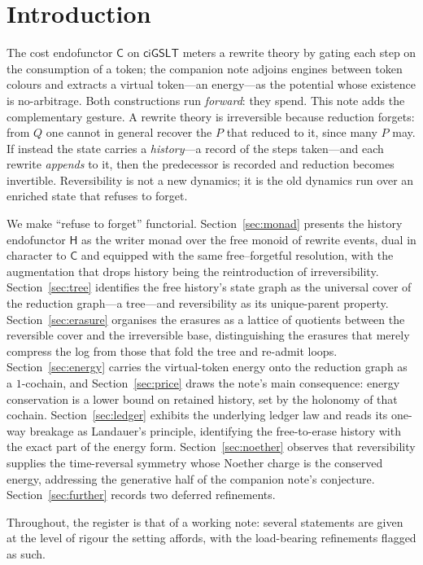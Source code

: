 \documentclass[11pt]{article}
\theoremstyle{definition}
\theoremstyle{plain}
\theoremstyle{remark}
\newcommand{\cost}{\mathsf{C}}
\newcommand{\hist}{\mathsf{H}}
\newcommand{\ciGSLT}{\mathsf{ciGSLT}}
\begin{document}
\section{Introduction}

The cost endofunctor $\cost$ on $\ciGSLT$ \cite{CE} meters a rewrite theory by gating each step on
the consumption of a token; the companion note \cite{VT} adjoins engines between token colours and
extracts a virtual token---an energy---as the potential whose existence is no-arbitrage. Both
constructions run \emph{forward}: they spend. This note adds the complementary gesture. A rewrite
theory is irreversible because reduction forgets: from $Q$ one cannot in general recover the $P$
that reduced to it, since many $P$ may. If instead the state carries a \emph{history}---a record of
the steps taken---and each rewrite \emph{appends} to it, then the predecessor is recorded and
reduction becomes invertible. Reversibility is not a new dynamics; it is the old dynamics run over
an enriched state that refuses to forget.

We make ``refuse to forget'' functorial. Section~\ref{sec:monad} presents the history endofunctor
$\hist$ as the writer monad over the free monoid of rewrite events, dual in character to $\cost$
and equipped with the same free--forgetful resolution, with the augmentation that drops history
being the reintroduction of irreversibility. Section~\ref{sec:tree} identifies the free history's
state graph as the universal cover of the reduction graph---a tree---and reversibility as its
unique-parent property. Section~\ref{sec:erasure} organises the erasures as a lattice of quotients
between the reversible cover and the irreversible base, distinguishing the erasures that merely
compress the log from those that fold the tree and re-admit loops. Section~\ref{sec:energy} carries
the virtual-token energy onto the reduction graph as a $1$-cochain, and Section~\ref{sec:price}
draws the note's main consequence: energy conservation is a lower bound on retained history, set by
the holonomy of that cochain. Section~\ref{sec:ledger} exhibits the underlying ledger law and reads
its one-way breakage as Landauer's principle, identifying the free-to-erase history with the exact
part of the energy form. Section~\ref{sec:noether} observes that reversibility supplies the
time-reversal symmetry whose Noether charge is the conserved energy, addressing the generative half
of the companion note's conjecture. Section~\ref{sec:further} records two deferred refinements.

Throughout, the register is that of a working note: several statements are given at the level of
rigour the setting affords, with the load-bearing refinements flagged as such.
\end{document}
